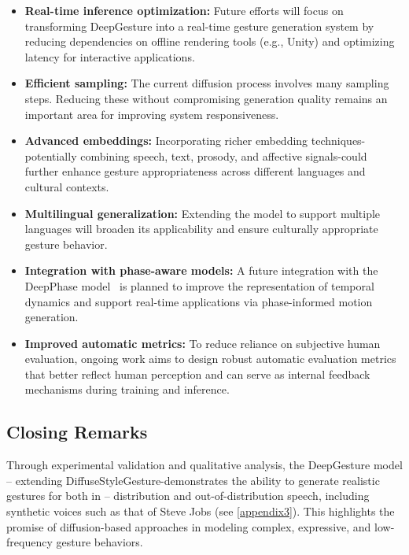 \begin{itemize}
	\item \textbf{Real-time inference optimization:} Future efforts will focus on transforming DeepGesture into a real-time gesture generation system by reducing dependencies on offline rendering tools (e.g., Unity) and optimizing latency for interactive applications.
	
	\item \textbf{Efficient sampling:} The current diffusion process involves many sampling steps. Reducing these without compromising generation quality remains an important area for improving system responsiveness.
	
	\item \textbf{Advanced embeddings:} Incorporating richer embedding techniques-potentially combining speech, text, prosody, and affective signals-could further enhance gesture appropriateness across different languages and cultural contexts.
	
	\item \textbf{Multilingual generalization:} Extending the model to support multiple languages will broaden its applicability and ensure culturally appropriate gesture behavior.
	
	\item \textbf{Integration with phase-aware models:} A future integration with the DeepPhase model~\citep{starke2022deepphase} is planned to improve the representation of temporal dynamics and support real-time applications via phase-informed motion generation.
	
	\item \textbf{Improved automatic metrics:} To reduce reliance on subjective human evaluation, ongoing work aims to design robust automatic evaluation metrics that better reflect human perception and can serve as internal feedback mechanisms during training and inference.
\end{itemize}

\subsection{Closing Remarks}

Through experimental validation and qualitative analysis, the DeepGesture model -- extending DiffuseStyleGesture-demonstrates the ability to generate realistic gestures for both in -- distribution and out-of-distribution speech, including synthetic voices such as that of Steve Jobs (see \autoref{appendix3}). This highlights the promise of diffusion-based approaches in modeling complex, expressive, and low-frequency gesture behaviors.

